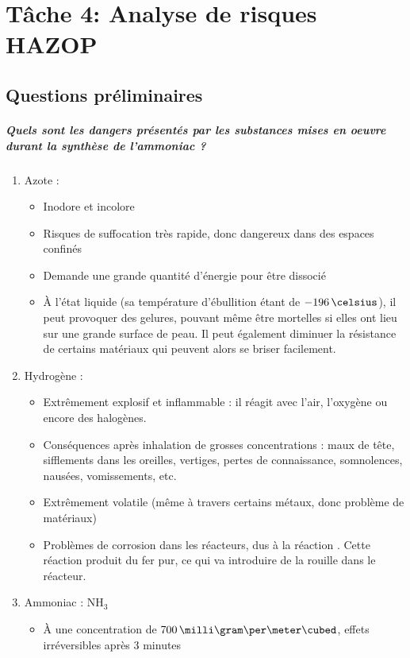 \chapter{Tâche 4: Analyse de risques HAZOP}

\section{Questions préliminaires}
\paragraph{Quels sont les dangers présentés par les substances mises en oeuvre durant la synthèse de l'ammoniac ?}
\begin{enumerate}
\item Azote : 
\begin{itemize}
\item Inodore et incolore
\item Risques de suffocation très rapide, donc dangereux dans des espaces confinés
\item Demande une grande quantité d’énergie pour être dissocié
\item À l'état liquide (sa température d'ébullition étant de $-196\,\celsius$), il peut provoquer des gelures, pouvant même être mortelles si elles ont lieu sur une grande surface de peau. Il peut également diminuer la résistance de certains matériaux qui peuvent alors se briser facilement.
\end{itemize}
\item Hydrogène : 
\begin{itemize}
\item Extrêmement explosif et inflammable : il réagit avec l'air, l'oxygène ou encore des halogènes.
\item Conséquences après inhalation de grosses concentrations : maux de tête, sifflements dans les oreilles, vertiges, pertes de connaissance, somnolences,  nausées, vomissements, etc.
\item Extrêmement volatile (même à travers certains métaux, donc problème de matériaux)
\item Problèmes de corrosion dans les réacteurs, dus à la réaction
.
Cette réaction produit du fer pur, ce qui va introduire de la rouille dans le réacteur.
\end{itemize}
\item Ammoniac : NH$_3$
\begin{itemize}
\item À une concentration de $700\,\milli\gram\per\meter\cubed$, effets irréversibles après 3 minutes

\end{itemize}
\end{enumerate}
